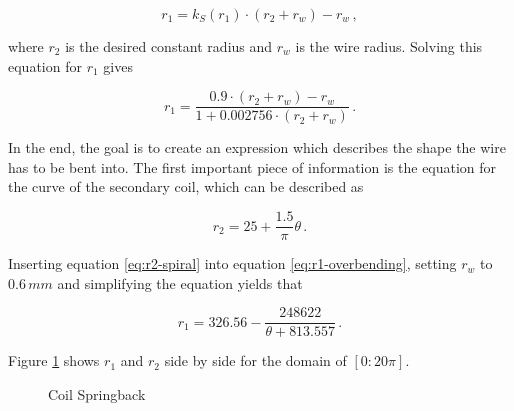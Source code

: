 \begin{equation}
    r_1 = k_S(r_1) \cdot \left(r_2 + r_w\right) - r_w\,,
\end{equation}

where \(r_2\) is the desired constant radius and \(r_w\) is the wire radius. Solving this equation for \(r_1\) gives

\begin{equation}\label{eq:r1-overbending}
    r_1 = \frac{0.9 \cdot \left( r_2 + r_w \right) - r_w}{1 + 0.002756 \cdot \left(r_2 + r_w\right)}\,.
\end{equation}

In the end, the goal is to create an expression which describes the shape the wire has to be bent into. The first important piece of information is the equation for the curve of the secondary coil, which can be described as

\begin{equation}\label{eq:r2-spiral}
    r_2 = 25 + \frac{1.5}{\pi} \theta\,.
\end{equation}

Inserting equation \ref{eq:r2-spiral} into equation \ref{eq:r1-overbending}, setting \(r_w\) to \(0.6\,mm\) and simplifying the equation yields that

\begin{equation}
    r_1 = 326.56 - \frac{248622}{\theta + 813.557}\,.
\end{equation}

Figure \ref{fig:spirals} shows \(r_1\) and \(r_2\) side by side for the domain of \([0:20\pi]\).

\begin{figure}[h!]
    \centering
    \caption{Coil Springback}
    \label{fig:spirals}
\end{figure}


